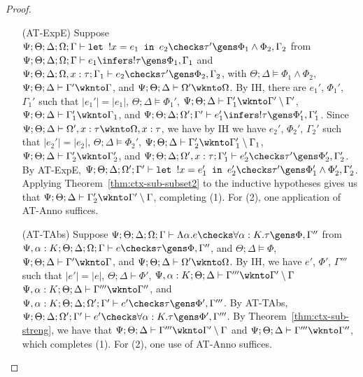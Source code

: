 \begin{proof}
\begin{itemize}
  \item[(AT-ExpE)] Suppose $\Psi ; \Theta ; \Delta ; \Omega ; \Gamma \vdash \texttt{let } !x = e_1 \texttt{ in } e_2 \checks \tau' \gens \Phi_1 \wedge \Phi_2, \Gamma_2$
  from $\Psi ; \Theta ; \Delta ; \Omega ; \Gamma \vdash e_1 \infers !\tau \gens \Phi_1,\Gamma_1$
  and $\Psi ; \Theta ; \Delta ; \Omega, x : \tau ; \Gamma_1 \vdash e_2 \checks \tau' \gens \Phi_2,\Gamma_2$, with
  $\Theta ; \Delta \vDash \Phi_1 \wedge \Phi_2$,
  $\Psi ; \Theta ; \Delta \vdash \Gamma' \wknto \Gamma$, and
  $\Psi ; \Theta ; \Delta \vdash \Omega' \wknto \Omega$.
  By IH, there are $e_1'$, $\Phi_1'$, $\Gamma_1'$ such that
  $|e_1'| = |e_1|$,
  $\Theta ; \Delta \vDash \Phi_1'$,
  $\Psi ; \Theta ; \Delta \vdash \Gamma_1' \wknto \Gamma' \setminus \Gamma'$,
  $\Psi ; \Theta ; \Delta \vdash \Gamma_1' \wknto \Gamma_1$, and  
  $\Psi ; \Theta ; \Delta ; \Omega' ; \Gamma' \vdash e_1' \infers !\tau \gens \Phi_1',\Gamma_1'$.
  Since $\Psi ; \Theta ; \Delta \vdash \Omega', x : \tau \wknto \Omega, x : \tau$, we have
  by IH we have $e_2'$, $\Phi_2'$, $\Gamma_2'$ such that
  $|e_2'| = |e_2|$,
  $\Theta ; \Delta \vDash \Phi_2'$,
  $\Psi ; \Theta ; \Delta \vdash \Gamma_2' \wknto \Gamma_1' \setminus \Gamma_1$,
  $\Psi ; \Theta ; \Delta \vdash \Gamma_2' \wknto \Gamma_2'$, and
  $\Psi ; \Theta ; \Delta ; \Omega', x : \tau ; \Gamma_1' \vdash e_2' \checks \tau' \gens \Phi_2',\Gamma_2'$.
  By AT-ExpE,
  $\Psi ; \Theta ; \Delta ; \Omega' ; \Gamma' \vdash \texttt{let } !x = e_1' \texttt{ in } e_2' \checks \tau' \gens \Phi_1' \wedge \Phi_2', \Gamma_2'$.
  Applying Theorem~\ref{thm:ctx-sub-subset2} to the inductive hypotheses gives us that
  $\Psi ; \Theta ; \Delta \vdash \Gamma_2' \wknto \Gamma' \setminus \Gamma$, completing (1).
  For (2), one application of AT-Anno suffices.
  
  \item[(AT-TAbs)] Suppose $\Psi ; \Theta ; \Delta ; \Omega ; \Gamma \vdash \Lambda \alpha. e \checks \forall \alpha : K.\tau \gens \Phi,\Gamma''$ from
  $\Psi, \alpha : K ; \Theta ; \Delta ; \Omega ; \Gamma \vdash e \checks \tau \gens \Phi, \Gamma''$, and
  $\Theta ; \Delta \vDash \Phi$,
  $\Psi ; \Theta ; \Delta \vdash \Gamma' \wknto \Gamma$, and
  $\Psi ; \Theta ; \Delta \vdash \Omega' \wknto \Omega$.
  By IH, we have $e'$, $\Phi'$, $\Gamma'''$ such that
  $|e'| = |e|$,
  $\Theta ; \Delta \vdash \Phi'$,
  $\Psi, \alpha : K ; \Theta ; \Delta \vdash \Gamma''' \wknto \Gamma' \setminus \Gamma$
  $\Psi, \alpha : K ; \Theta ; \Delta \vdash \Gamma''' \wknto \Gamma''$, and
  $\Psi, \alpha : K ; \Theta ; \Delta ; \Omega' ; \Gamma' \vdash e' \checks \tau \gens \Phi',\Gamma'''$.
  By AT-TAbs, $\Psi ; \Theta ; \Delta ; \Omega' ; \Gamma' \vdash e' \checks \forall \alpha : K. \tau \gens \Phi',\Gamma'''$.
  By Theorem~\ref{thm:ctx-sub-streng}, we have that $\Psi ; \Theta ; \Delta \vdash \Gamma''' \wknto \Gamma' \setminus \Gamma$
  and $\Psi  ; \Theta ; \Delta \vdash \Gamma''' \wknto \Gamma''$, which completes (1).
  For (2), one use of AT-Anno suffices.
  

\end{itemize}
\end{proof}
